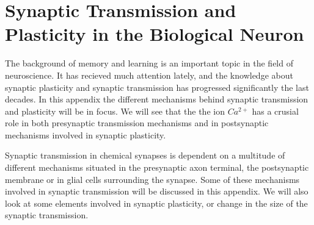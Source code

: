 
\appendix
\chapter{Synaptic Transmission and Plasticity in the Biological Neuron} %



\label{appendixSynPlast}

The background of memory and learning is an important topic in the field of neuroscience. 
It has recieved much attention lately, and the knowledge about synaptic plasticity and synaptic transmission has progressed significantly the last decades.
In this appendix the different mechanisms behind synaptic transmission and plasticity will be in focus.
We will see that the the ion $Ca^{2+}$ has a crusial role in both presynaptic transmission mechanisms and in postsynaptic mechanisms involved in synaptic plasticity.


Synaptic transmission in chemical synapses is dependent on a multitude of different mechanisms situated in the presynaptic axon terminal, the postsynaptic membrane or in glial cells surrounding the synapse.
Some of these mechanisms involved in synaptic transmission will be discussed in this appendix.
We will also look at some elements involved in synaptic plasticity, or change in the size of the synaptic transmission. %

